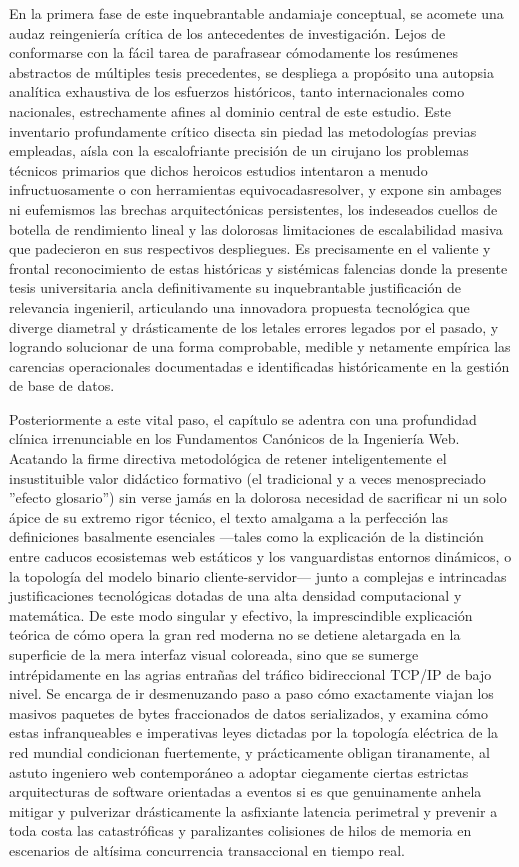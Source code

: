 En la primera fase de este inquebrantable andamiaje conceptual, se acomete una audaz reingeniería crítica de los antecedentes de investigación. Lejos de conformarse con la fácil tarea de parafrasear cómodamente los resúmenes abstractos de múltiples tesis precedentes, se despliega a propósito una autopsia analítica exhaustiva de los esfuerzos históricos, tanto internacionales como nacionales, estrechamente afines al dominio central de este estudio. Este inventario profundamente crítico disecta sin piedad las metodologías previas empleadas, aísla con la escalofriante precisión de un cirujano los problemas técnicos primarios que dichos heroicos estudios intentaron \textemdash a menudo infructuosamente o con herramientas equivocadas\textemdash resolver, y expone sin ambages ni eufemismos las brechas arquitectónicas persistentes, los indeseados cuellos de botella de rendimiento lineal y las dolorosas limitaciones de escalabilidad masiva que padecieron en sus respectivos despliegues. Es precisamente en el valiente y frontal reconocimiento de estas históricas y sistémicas falencias donde la presente tesis universitaria ancla definitivamente su inquebrantable justificación de relevancia ingenieril, articulando una innovadora propuesta tecnológica que diverge diametral y drásticamente de los letales errores legados por el pasado, y logrando solucionar de una forma comprobable, medible y netamente empírica las carencias operacionales documentadas e identificadas históricamente en la gestión de base de datos.

Posteriormente a este vital paso, el capítulo se adentra con una profundidad clínica irrenunciable en los Fundamentos Canónicos de la Ingeniería Web. Acatando la firme directiva metodológica de retener inteligentemente el insustituible valor didáctico formativo (el tradicional y a veces menospreciado ''efecto glosario'') sin verse jamás en la dolorosa necesidad de sacrificar ni un solo ápice de su extremo rigor técnico, el texto amalgama a la perfección las definiciones basalmente esenciales ---tales como la explicación de la distinción entre caducos ecosistemas web estáticos y los vanguardistas entornos dinámicos, o la topología del modelo binario cliente-servidor--- junto a complejas e intrincadas justificaciones tecnológicas dotadas de una alta densidad computacional y matemática. De este modo singular y efectivo, la imprescindible explicación teórica de cómo opera la gran red moderna no se detiene aletargada en la superficie de la mera interfaz visual coloreada, sino que se sumerge intrépidamente en las agrias entrañas del tráfico bidireccional TCP/IP de bajo nivel. Se encarga de ir desmenuzando paso a paso cómo exactamente viajan los masivos paquetes de bytes fraccionados de datos serializados, y examina cómo estas infranqueables e imperativas leyes dictadas por la topología eléctrica de la red mundial condicionan fuertemente, y prácticamente obligan tiranamente, al astuto ingeniero web contemporáneo a adoptar ciegamente ciertas estrictas arquitecturas de software orientadas a eventos si es que genuinamente anhela mitigar y pulverizar drásticamente la asfixiante latencia perimetral y prevenir a toda costa las catastróficas y paralizantes colisiones de hilos de memoria en escenarios de altísima concurrencia transaccional en tiempo real.

